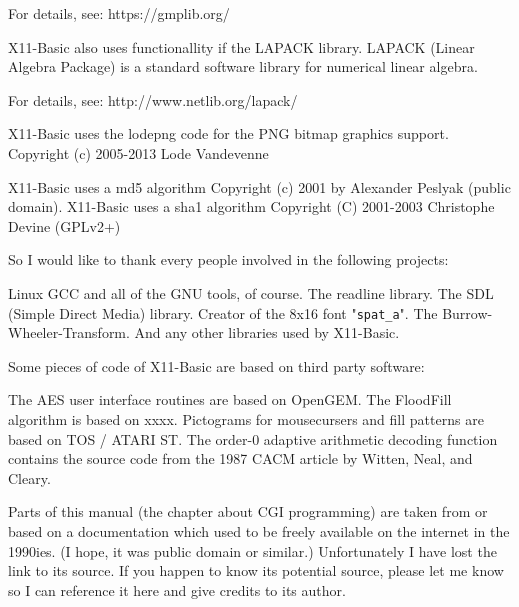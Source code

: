 For details, see: https://gmplib.org/

X11-Basic also uses functionallity if the LAPACK library. 
LAPACK (Linear Algebra Package) is a standard software library for 
numerical linear algebra. 

For details, see: http://www.netlib.org/lapack/

X11-Basic uses the lodepng code for the PNG bitmap graphics support.
Copyright (c) 2005-2013 Lode Vandevenne

X11-Basic uses a md5 algorithm  Copyright (c) 2001 by Alexander Peslyak (public domain).
X11-Basic uses a sha1 algorithm Copyright (C) 2001-2003  Christophe Devine (GPLv2+)

So I would like to thank every people involved in the following projects:

    Linux
    GCC and all of the GNU tools, of course.
    The readline library.
    The SDL (Simple Direct Media) library.
    Creator of the 8x16 font "\verb|spat_a|".
    The Burrow-Wheeler-Transform.
    And any other libraries used by X11-Basic.
 
Some pieces of code of X11-Basic are based on third party software:

    The AES user interface routines are based on OpenGEM.
    The FloodFill algorithm is based on xxxx.
    Pictograms for mousecursers and fill patterns are based on TOS / ATARI ST.
    The order-0 adaptive arithmetic decoding function  contains the source code 
    from the 1987 CACM article by Witten, Neal, and Cleary.
    

Parts of this manual (the chapter about CGI programming) are taken from or 
based on a documentation which used to be freely available on the internet  in
the 1990ies. (I hope, it was public domain or similar.) Unfortunately I have
lost the link to its source. If you happen to know its potential source, please
let me know so I can reference it here and give credits to its author.
